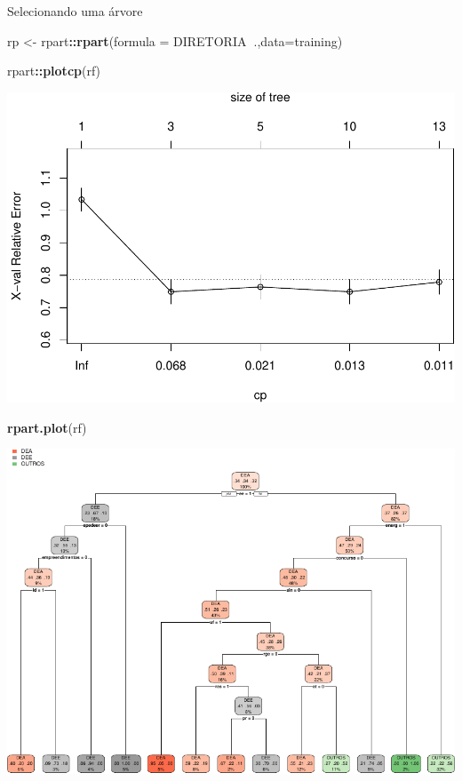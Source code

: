 \documentclass[]{article}
\newenvironment{Shaded}{\begin{snugshade}}{\end{snugshade}}
\newcommand{\KeywordTok}[1]{\textcolor[rgb]{0.13,0.29,0.53}{\textbf{#1}}}
\newcommand{\DataTypeTok}[1]{\textcolor[rgb]{0.13,0.29,0.53}{#1}}
\newcommand{\StringTok}[1]{\textcolor[rgb]{0.31,0.60,0.02}{#1}}
\newcommand{\OperatorTok}[1]{\textcolor[rgb]{0.81,0.36,0.00}{\textbf{#1}}}
\newcommand{\NormalTok}[1]{#1}
\begin{document}
Selecionando uma árvore

\begin{Shaded}
\begin{Highlighting}[]
\NormalTok{rp <-}\StringTok{ }\NormalTok{rpart}\OperatorTok{::}\KeywordTok{rpart}\NormalTok{(}\DataTypeTok{formula =}\NormalTok{ DIRETORIA}\OperatorTok{~}\NormalTok{.,}\DataTypeTok{data=}\NormalTok{training)}
\end{Highlighting}
\end{Shaded}

\begin{Shaded}
\begin{Highlighting}[]
\NormalTok{rpart}\OperatorTok{::}\KeywordTok{plotcp}\NormalTok{(rf)}
\end{Highlighting}
\end{Shaded}

\includegraphics{markdown_v41_test_files/figure-latex/unnamed-chunk-82-1.pdf}

\begin{Shaded}
\begin{Highlighting}[]
\KeywordTok{rpart.plot}\NormalTok{(rf)}
\end{Highlighting}
\end{Shaded}

\includegraphics{markdown_v41_test_files/figure-latex/unnamed-chunk-82-2.pdf}
\end{document}
